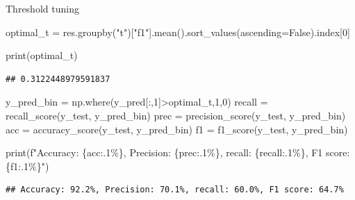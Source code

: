 \documentclass[
  10pt,
  ignorenonframetext,
  aspectratio=169]{beamer}
\newenvironment{Shaded}{\begin{snugshade}}{\end{snugshade}}
\newcommand{\BuiltInTok}[1]{\textcolor[rgb]{0.80,0.80,0.80}{#1}}
\newcommand{\DecValTok}[1]{\textcolor[rgb]{0.86,0.86,0.80}{#1}}
\newcommand{\NormalTok}[1]{\textcolor[rgb]{0.80,0.80,0.80}{#1}}
\newcommand{\OperatorTok}[1]{\textcolor[rgb]{0.94,0.94,0.82}{#1}}
\newcommand{\SpecialCharTok}[1]{\textcolor[rgb]{0.86,0.64,0.64}{#1}}
\newcommand{\SpecialStringTok}[1]{\textcolor[rgb]{0.80,0.58,0.58}{#1}}
\newcommand{\StringTok}[1]{\textcolor[rgb]{0.80,0.58,0.58}{#1}}
\newcommand{\VariableTok}[1]{\textcolor[rgb]{0.80,0.80,0.80}{#1}}
\begin{document}
\begin{frame}[fragile]{Threshold tuning}
\protect\hypertarget{threshold-tuning-1}{}
\medskip
\scriptsize

\begin{Shaded}
\begin{Highlighting}[]
\NormalTok{optimal\_t }\OperatorTok{=}\NormalTok{ res.groupby(}\StringTok{"t"}\NormalTok{)[}\StringTok{"f1"}\NormalTok{].mean().sort\_values(ascending}\OperatorTok{=}\VariableTok{False}\NormalTok{).index[}\DecValTok{0}\NormalTok{]}

\BuiltInTok{print}\NormalTok{(optimal\_t)}
\end{Highlighting}
\end{Shaded}

\begin{verbatim}
## 0.3122448979591837
\end{verbatim}

\begin{Shaded}
\begin{Highlighting}[]
\NormalTok{y\_pred\_bin }\OperatorTok{=}\NormalTok{ np.where(y\_pred[:,}\DecValTok{1}\NormalTok{]}\OperatorTok{\textgreater{}}\NormalTok{optimal\_t,}\DecValTok{1}\NormalTok{,}\DecValTok{0}\NormalTok{)}
\NormalTok{recall }\OperatorTok{=}\NormalTok{ recall\_score(y\_test, y\_pred\_bin)}
\NormalTok{prec }\OperatorTok{=}\NormalTok{ precision\_score(y\_test, y\_pred\_bin)}
\NormalTok{acc }\OperatorTok{=}\NormalTok{ accuracy\_score(y\_test, y\_pred\_bin)}
\NormalTok{f1 }\OperatorTok{=}\NormalTok{ f1\_score(y\_test, y\_pred\_bin)}

\BuiltInTok{print}\NormalTok{(}\SpecialStringTok{f"Accuracy: }\SpecialCharTok{\{}\NormalTok{acc}\SpecialCharTok{:.1\%\}}\SpecialStringTok{, Precision: }\SpecialCharTok{\{}\NormalTok{prec}\SpecialCharTok{:.1\%\}}\SpecialStringTok{, recall: }\SpecialCharTok{\{}\NormalTok{recall}\SpecialCharTok{:.1\%\}}\SpecialStringTok{, F1 score: }\SpecialCharTok{\{}\NormalTok{f1}\SpecialCharTok{:.1\%\}}\SpecialStringTok{"}\NormalTok{)}
\end{Highlighting}
\end{Shaded}

\begin{verbatim}
## Accuracy: 92.2%, Precision: 70.1%, recall: 60.0%, F1 score: 64.7%
\end{verbatim}
\end{frame}
\end{document}
